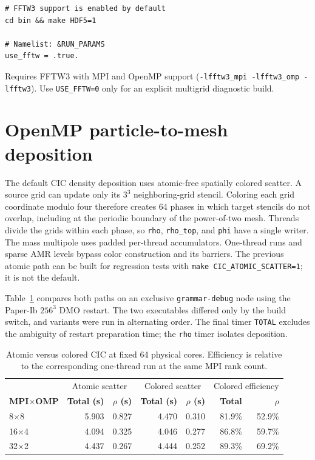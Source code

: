\documentclass[11pt,fleqn]{book}
\begin{document}
\begin{verbatim}
# FFTW3 support is enabled by default
cd bin && make HDF5=1

# Namelist: &RUN_PARAMS
use_fftw = .true.
\end{verbatim}

Requires FFTW3 with MPI and OpenMP support (\texttt{-lfftw3\_mpi -lfftw3\_omp -lfftw3}).
Use \texttt{USE\_FFTW=0} only for an explicit multigrid diagnostic build.

\section{OpenMP particle-to-mesh deposition}

The default CIC density deposition uses atomic-free spatially colored
scatter.  A source grid can update only its $3^3$ neighboring-grid stencil.
Coloring each grid coordinate modulo four therefore creates 64 phases in
which target stencils do not overlap, including at the periodic boundary of
the power-of-two mesh.  Threads divide the grids within each phase, so
\texttt{rho}, \texttt{rho\_top}, and \texttt{phi} have a single writer.
The mass multipole uses padded per-thread accumulators.  One-thread runs and
sparse AMR levels bypass color construction and its barriers.  The previous
atomic path can be built for regression tests with
\texttt{make CIC\_ATOMIC\_SCATTER=1}; it is not the default.

Table~\ref{tab:cic-colored-scaling} compares both paths on an exclusive
\texttt{grammar-debug} node using the Paper-Ib $256^3$ DMO restart.  The two
executables differed only by the build switch, and variants were run in
alternating order.  The final timer \texttt{TOTAL} excludes the ambiguity of
restart preparation time; the \texttt{rho} timer isolates deposition.

\begin{table}[htbp]
\caption{Atomic versus colored CIC at fixed 64 physical cores.  Efficiency is
relative to the corresponding one-thread run at the same MPI rank count.}
\label{tab:cic-colored-scaling}
\begin{center}
\small
\begin{tabular}{lrrrrrr}
\toprule
 & \multicolumn{2}{c}{Atomic scatter} & \multicolumn{2}{c}{Colored scatter} & \multicolumn{2}{c}{Colored efficiency} \\
\textbf{MPI$\times$OMP} & \textbf{Total (s)} & \textbf{$\rho$ (s)} & \textbf{Total (s)} & \textbf{$\rho$ (s)} & \textbf{Total} & \textbf{$\rho$} \\
\midrule
8$\times$8  & 5.903 & 0.827 & 4.470 & 0.310 & 81.9\% & 52.9\% \\
16$\times$4 & 4.094 & 0.325 & 4.046 & 0.277 & 86.8\% & 59.7\% \\
32$\times$2 & 4.437 & 0.267 & 4.444 & 0.252 & 89.3\% & 69.2\% \\
\bottomrule
\end{tabular}
\end{center}
\end{table}
\end{document}
